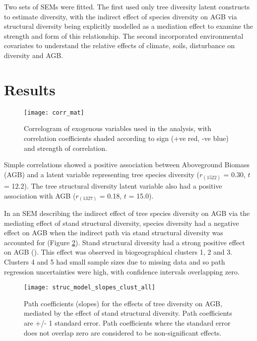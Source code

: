 \documentclass[11pt,a4paper]{article}
\begin{document}
Two sets of SEMs were fitted. The first used only tree diversity latent constructs to estimate diversity, with the indirect effect of species diversity on AGB via structural diversity being explicitly modelled as a mediation effect to examine the strength and form of this relationship. The second incorporated environmental covariates to understand the relative effects of climate, soils, disturbance on diversity and AGB.

\section{Results}

\begin{figure}[H]
\centering
	\texttt{[image: corr\_mat]}
	\caption{Correlogram of exogenous variables used in the analysis, with correlation coefficients shaded according to sign (+ve red, -ve blue) and strength of correlation.}
	\label{corr_mat}
\end{figure}

Simple correlations showed a positive association between Aboveground Biomass (AGB) and a latent variable representing tree species diversity ($r_{(1522)}$ = 0.30, $t$ = 12.2). The tree structural diversity latent variable also had a positive association with AGB ($r_{(1327)}$ = 0.18, $t$ = 15.0).

In an SEM describing the indirect effect of tree species diversity on AGB via the mediating effect of stand structural diversity, species diversity had a negative effect on AGB when the indirect path via stand structural diversity was accounted for (Figure \ref{struc_model_slopes}). Stand structural diversity had a strong positive effect on AGB (). This effect was observed in biogeographical clusters 1, 2 and 3. Clusters 4 and 5 had small sample sizes due to missing data and so path regression uncertainties were high, with confidence intervals overlapping zero. 

\begin{figure}[H]
\centering
	\texttt{[image: struc\_model\_slopes\_clust\_all]}
	\caption{Path coefficients (slopes) for the effects of tree diversity on AGB, mediated by the effect of stand structural diversity. Path coefficients are +/- 1 standard error. Path coefficients where the standard error does not overlap zero are considered to be non-significant effects.}
	\label{struc_model_slopes}
\end{figure}


\end{document}
